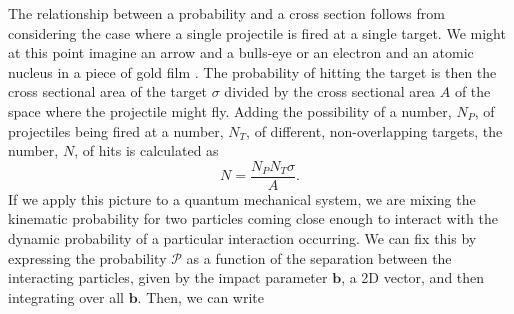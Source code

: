 The relationship between a probability and a cross section follows from considering the case where a single projectile is fired at a single target. We might at this point imagine an arrow and a bulls-eye or an electron and an atomic nucleus in a piece of gold film \cite{rutherford}. The probability of hitting the target is then the cross sectional area of the target $\sigma$ divided by the cross sectional area $A$ of the space where the projectile might fly. Adding the possibility of a number, $N_P$, of projectiles being fired at a number, $N_T$, of different, non-overlapping targets, the number, $N$, of hits is calculated as
\[N=\frac{N_P N_T \sigma}{A}.\]
If we apply this picture to a quantum mechanical system, we are mixing the kinematic probability for two particles coming close enough to interact with the dynamic probability of a particular interaction occurring. We can fix this by expressing the probability $\mathcal P$ as a function of the separation between the interacting particles, given by the impact parameter $\mathbf b$, a 2D vector, and then integrating over all $\mathbf b$. Then, we can write
